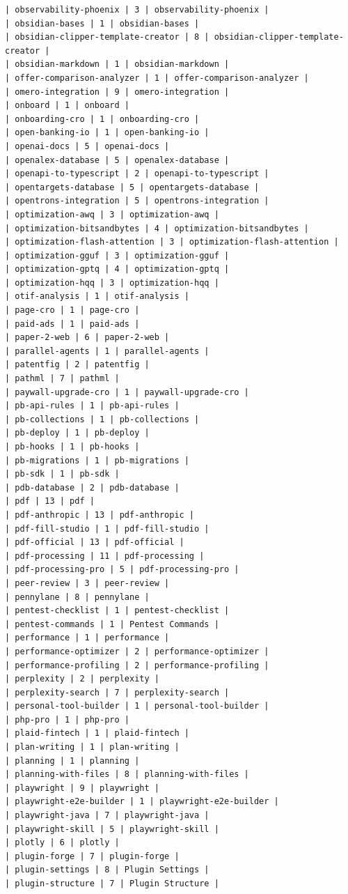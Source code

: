 \begin{Verbatim}[breaklines,breakanywhere,fontsize=\footnotesize]
| observability-phoenix | 3 | observability-phoenix |
| obsidian-bases | 1 | obsidian-bases |
| obsidian-clipper-template-creator | 8 | obsidian-clipper-template-creator |
| obsidian-markdown | 1 | obsidian-markdown |
| offer-comparison-analyzer | 1 | offer-comparison-analyzer |
| omero-integration | 9 | omero-integration |
| onboard | 1 | onboard |
| onboarding-cro | 1 | onboarding-cro |
| open-banking-io | 1 | open-banking-io |
| openai-docs | 5 | openai-docs |
| openalex-database | 5 | openalex-database |
| openapi-to-typescript | 2 | openapi-to-typescript |
| opentargets-database | 5 | opentargets-database |
| opentrons-integration | 5 | opentrons-integration |
| optimization-awq | 3 | optimization-awq |
| optimization-bitsandbytes | 4 | optimization-bitsandbytes |
| optimization-flash-attention | 3 | optimization-flash-attention |
| optimization-gguf | 3 | optimization-gguf |
| optimization-gptq | 4 | optimization-gptq |
| optimization-hqq | 3 | optimization-hqq |
| otif-analysis | 1 | otif-analysis |
| page-cro | 1 | page-cro |
| paid-ads | 1 | paid-ads |
| paper-2-web | 6 | paper-2-web |
| parallel-agents | 1 | parallel-agents |
| patentfig | 2 | patentfig |
| pathml | 7 | pathml |
| paywall-upgrade-cro | 1 | paywall-upgrade-cro |
| pb-api-rules | 1 | pb-api-rules |
| pb-collections | 1 | pb-collections |
| pb-deploy | 1 | pb-deploy |
| pb-hooks | 1 | pb-hooks |
| pb-migrations | 1 | pb-migrations |
| pb-sdk | 1 | pb-sdk |
| pdb-database | 2 | pdb-database |
| pdf | 13 | pdf |
| pdf-anthropic | 13 | pdf-anthropic |
| pdf-fill-studio | 1 | pdf-fill-studio |
| pdf-official | 13 | pdf-official |
| pdf-processing | 11 | pdf-processing |
| pdf-processing-pro | 5 | pdf-processing-pro |
| peer-review | 3 | peer-review |
| pennylane | 8 | pennylane |
| pentest-checklist | 1 | pentest-checklist |
| pentest-commands | 1 | Pentest Commands |
| performance | 1 | performance |
| performance-optimizer | 2 | performance-optimizer |
| performance-profiling | 2 | performance-profiling |
| perplexity | 2 | perplexity |
| perplexity-search | 7 | perplexity-search |
| personal-tool-builder | 1 | personal-tool-builder |
| php-pro | 1 | php-pro |
| plaid-fintech | 1 | plaid-fintech |
| plan-writing | 1 | plan-writing |
| planning | 1 | planning |
| planning-with-files | 8 | planning-with-files |
| playwright | 9 | playwright |
| playwright-e2e-builder | 1 | playwright-e2e-builder |
| playwright-java | 7 | playwright-java |
| playwright-skill | 5 | playwright-skill |
| plotly | 6 | plotly |
| plugin-forge | 7 | plugin-forge |
| plugin-settings | 8 | Plugin Settings |
| plugin-structure | 7 | Plugin Structure |

\end{Verbatim}
